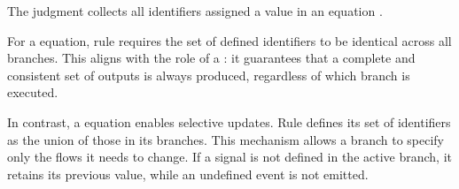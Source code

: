 The judgment  collects all identifiers assigned a value in an equation \Eq.

For a  equation, rule  requires the
set of defined identifiers to be identical across all branches. This aligns with the role of a
: it guarantees that a complete and consistent set of outputs is always produced,
regardless of which branch is executed.

In contrast, a  equation enables selective updates. Rule
 defines its set of identifiers as the union of
those in its branches. This mechanism allows a branch to specify only the flows it needs to change.
If a signal is not defined in the active branch, it retains its previous value, while an undefined
event is not emitted.

